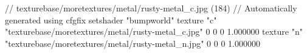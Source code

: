 // texturebase/moretextures/metal/rusty-metal_c.jpg (184)
// Automatically generated using cfgfix
setshader "bumpworld"
texture "c" "texturebase/moretextures/metal/rusty-metal_c.jpg" 0 0 0 1.000000
texture "n" "texturebase/moretextures/metal/rusty-metal_n.jpg" 0 0 0 1.000000

